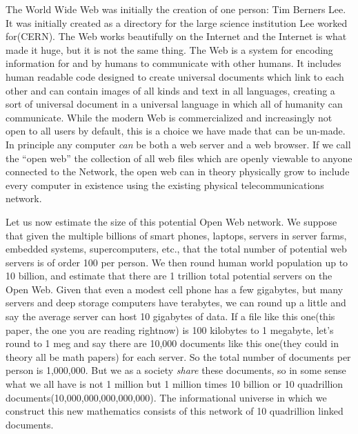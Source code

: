 \documentclass[12pt,a4paper]{amsart}
\numberwithin{equation}{section}
\begin{document}
The World Wide Web was initially the creation of one person: Tim Berners
Lee. It was initially created as a directory for the large science
institution Lee worked for(CERN). The Web works beautifully on the
Internet and the Internet is what made it huge, but it is not the same
thing. The Web is a system for encoding information for and by humans to
communicate with other humans. It includes human readable code designed
to create universal documents which link to each other and can contain
images of all kinds and text in all languages, creating a sort of
universal document in a universal language in which all of humanity can
communicate. While the modern Web is commercialized and increasingly not
open to all users by default, this is a choice we have made that can be
un-made. In principle any computer \emph{can} be both a web server and a
web browser. If we call the ``open web'' the collection of all web files
which are openly viewable to anyone connected to the Network, the open
web can in theory physically grow to include every computer in existence
using the existing physical telecommunications network.

Let us now estimate the size of this potential Open Web network. We
suppose that given the multiple billions of smart phones, laptops,
servers in server farms, embedded systems, supercomputers, etc., that
the total number of potential web servers is of order 100 per person. We
then round human world population up to 10 billion, and estimate that
there are 1 trillion total potential servers on the Open Web. Given that
even a modest cell phone has a few gigabytes, but many servers and deep
storage computers have terabytes, we can round up a little and say the
average server can host 10 gigabytes of data. If a file like this
one(this paper, the one you are reading rightnow) is 100 kilobytes to 1
megabyte, let's round to 1 meg and say there are 10,000 documents like
this one(they could in theory all be math papers) for each server. So
the total number of documents per person is 1,000,000. But we as a
society \emph{share} these documents, so in some sense what we all have
is not 1 million but 1 million times 10 billion or 10 quadrillion
documents(10,000,000,000,000,000). The informational universe in which
we construct this new mathematics consists of this network of 10
quadrillion linked documents.
\end{document}
